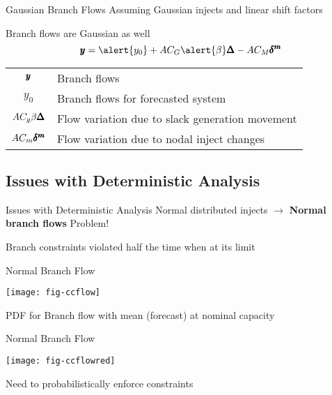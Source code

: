 \begin{frame}{Gaussian Branch Flows}
Assuming Gaussian injects and linear shift factors
\bi
\item Branch flows are Gaussian as well
\ei
\pause
\begin{equation*}
 \ry = \alert{y_0}+ A C_G\alert{ \beta }\rD  - A C_M \rdm 
\end{equation*}
\pause
\begin{tabular}{c l}
$\pmb{y}$ & Branch flows \\
$y_0$ & Branch flows for forecasted system \\
$A C_g \beta \pmb{\Delta}$ &  Flow variation due to slack generation movement \\
$A C_m \pmb{\delta^m} $ & Flow variation due to nodal inject changes
\end{tabular}

\end{frame}




\subsection{Issues with Deterministic Analysis}
\begin{frame}{Issues with Deterministic Analysis}
Normal distributed injects 
\pause 
$\rightarrow $
\textbf{Normal branch flows}\footnotemark
\vspace{20px}
\pause
\alert{Problem!}
\bi
\item Branch constraints violated half the time when at its limit
\ei
\end{frame}

\begin{frame}{Normal Branch Flow}
\begin{center}
\texttt{[image: fig-ccflow]}
\end{center}
PDF for Branch flow with mean (forecast) at nominal capacity
\end{frame}


\begin{frame}{Normal Branch Flow}
\begin{center}
\texttt{[image: fig-ccflowred]}
\end{center}

\alert{Need to probabilistically enforce constraints}

\end{frame}


